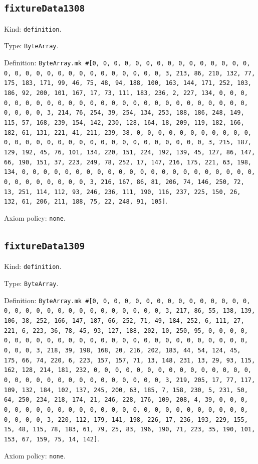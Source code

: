 \documentclass[11pt]{article}
\begin{document}
\subsection*{\texttt{fixtureData1308}}
\noindent Kind: \texttt{definition}.\par
\noindent Type: \texttt{ByteArray}.\par
\noindent Definition: \texttt{ByteArray.mk \#[0, 0, 0, 0, 0, 0, 0, 0, 0, 0, 0, 0, 0, 0, 0, 0, 0, 0, 0, 0, 0, 0, 0, 0, 0, 0, 0, 0, 0, 0, 3, 213, 86, 210, 132, 77, 175, 183, 171, 99, 46, 75, 48, 94, 188, 100, 163, 144, 171, 252, 103, 186, 92, 200, 101, 167, 17, 73, 111, 183, 236, 2, 227, 134, 0, 0, 0, 0, 0, 0, 0, 0, 0, 0, 0, 0, 0, 0, 0, 0, 0, 0, 0, 0, 0, 0, 0, 0, 0, 0, 0, 0, 0, 0, 3, 214, 76, 254, 39, 254, 134, 253, 188, 186, 248, 149, 115, 57, 168, 239, 154, 142, 230, 128, 164, 18, 209, 119, 182, 166, 182, 61, 131, 221, 41, 211, 239, 38, 0, 0, 0, 0, 0, 0, 0, 0, 0, 0, 0, 0, 0, 0, 0, 0, 0, 0, 0, 0, 0, 0, 0, 0, 0, 0, 0, 0, 0, 0, 3, 215, 187, 129, 192, 45, 76, 101, 134, 220, 151, 224, 192, 139, 45, 127, 86, 147, 66, 190, 151, 37, 223, 249, 78, 252, 17, 147, 216, 175, 221, 63, 198, 134, 0, 0, 0, 0, 0, 0, 0, 0, 0, 0, 0, 0, 0, 0, 0, 0, 0, 0, 0, 0, 0, 0, 0, 0, 0, 0, 0, 0, 0, 0, 3, 216, 167, 86, 81, 206, 74, 146, 250, 72, 13, 251, 114, 112, 93, 246, 236, 111, 190, 116, 237, 225, 150, 26, 132, 61, 206, 211, 188, 75, 22, 248, 91, 105]}.\par
\noindent Axiom policy: \texttt{none}.\par
\subsection*{\texttt{fixtureData1309}}
\noindent Kind: \texttt{definition}.\par
\noindent Type: \texttt{ByteArray}.\par
\noindent Definition: \texttt{ByteArray.mk \#[0, 0, 0, 0, 0, 0, 0, 0, 0, 0, 0, 0, 0, 0, 0, 0, 0, 0, 0, 0, 0, 0, 0, 0, 0, 0, 0, 0, 0, 0, 3, 217, 86, 55, 138, 139, 106, 38, 252, 166, 147, 187, 66, 252, 71, 49, 184, 252, 6, 111, 27, 221, 6, 223, 36, 78, 45, 93, 127, 188, 202, 10, 250, 95, 0, 0, 0, 0, 0, 0, 0, 0, 0, 0, 0, 0, 0, 0, 0, 0, 0, 0, 0, 0, 0, 0, 0, 0, 0, 0, 0, 0, 0, 0, 3, 218, 39, 198, 168, 20, 216, 202, 183, 44, 54, 124, 45, 175, 66, 74, 220, 6, 223, 157, 157, 71, 13, 148, 231, 13, 29, 93, 115, 162, 128, 214, 181, 232, 0, 0, 0, 0, 0, 0, 0, 0, 0, 0, 0, 0, 0, 0, 0, 0, 0, 0, 0, 0, 0, 0, 0, 0, 0, 0, 0, 0, 0, 0, 3, 219, 205, 17, 77, 117, 109, 132, 184, 102, 137, 245, 200, 63, 185, 7, 158, 230, 5, 231, 50, 64, 250, 234, 218, 174, 21, 246, 228, 176, 109, 208, 4, 39, 0, 0, 0, 0, 0, 0, 0, 0, 0, 0, 0, 0, 0, 0, 0, 0, 0, 0, 0, 0, 0, 0, 0, 0, 0, 0, 0, 0, 0, 0, 3, 220, 112, 179, 141, 198, 226, 17, 236, 193, 229, 155, 15, 48, 115, 78, 183, 61, 79, 25, 83, 196, 190, 71, 223, 35, 190, 101, 153, 67, 159, 75, 14, 142]}.\par
\noindent Axiom policy: \texttt{none}.\par
\end{document}
